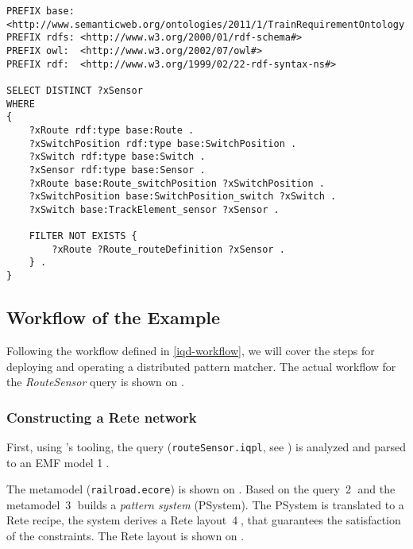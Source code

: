 \begin{lstlisting}[caption=The RouteSensor query in SPARQL, label=lst:routesensor-sparql]
PREFIX base: <http://www.semanticweb.org/ontologies/2011/1/TrainRequirementOntology.owl#>
PREFIX rdfs: <http://www.w3.org/2000/01/rdf-schema#>
PREFIX owl:  <http://www.w3.org/2002/07/owl#>
PREFIX rdf:  <http://www.w3.org/1999/02/22-rdf-syntax-ns#>

SELECT DISTINCT ?xSensor
WHERE
{
    ?xRoute rdf:type base:Route .
    ?xSwitchPosition rdf:type base:SwitchPosition .
    ?xSwitch rdf:type base:Switch .
    ?xSensor rdf:type base:Sensor .
    ?xRoute base:Route_switchPosition ?xSwitchPosition .
    ?xSwitchPosition base:SwitchPosition_switch ?xSwitch .
    ?xSwitch base:TrackElement_sensor ?xSensor .

    FILTER NOT EXISTS {
        ?xRoute ?Route_routeDefinition ?xSensor .
    } .
}
\end{lstlisting}



\subsection{Workflow of the Example}
\label{example-workflow}

Following the workflow defined in \autoref{iqd-workflow}, we will cover the steps for deploying and operating a distributed pattern matcher. The actual workflow for the \textit{RouteSensor} query is shown on .

\subsubsection{Constructing a Rete network}

First, using \eiq{}'s tooling, the query (\texttt{routeSensor.iqpl}, see ) is analyzed and parsed to an EMF model %
\textcircled{1}.


The metamodel (\texttt{railroad.ecore}) is shown on . Based on the query~\textcircled{2} and the metamodel~\textcircled{3} \eiq{} builds a \emph{pattern system} (PSystem). The PSystem is translated to a Rete recipe, the system derives a Rete layout~\textcircled{4}, that guarantees the satisfaction of the constraints. The Rete layout is shown on .

